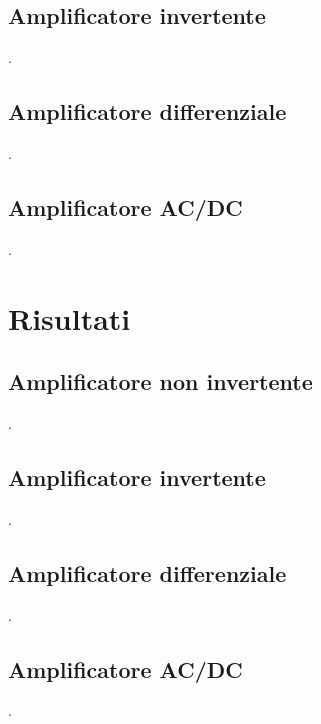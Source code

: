 \documentclass[a4paper]{article}
\begin{document}
		\subsection{Amplificatore invertente}
			.
		\subsection{Amplificatore differenziale}
			.
		\subsection{Amplificatore AC/DC}
			.
	\section{Risultati}
		\subsection{Amplificatore non invertente}
			.
		\subsection{Amplificatore invertente}
			.
		\subsection{Amplificatore differenziale}
			.
		\subsection{Amplificatore AC/DC}
			.
\end{document}
